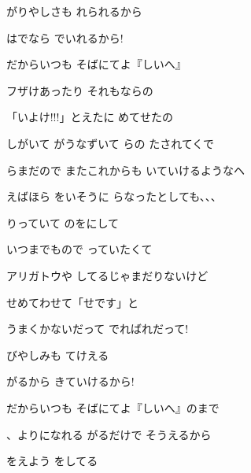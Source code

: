 \documentclass[14pt]{ltjsarticle}
\begin{document}
{  がりやしさも れられるから
  \jisho{}

  はでなら でいれるから!
  \jisho{}

  
だからいつも そばにてよ『しいへ』
  \jisho{}

\item
  フザけあったり それもならの
  \jisho{}

  
「いよけ!!!」とえたに めてせたの
  \jisho{}

  しがいて がうなずいて らの たされてくで
  \jisho{}

  らまだので またこれからも いていけるようなヘ
  \jisho{}

\item
  えばほら をいそうに らなったとしても、、、
  \jisho{}

\item
  りっていて のをにして
  \jisho{}

  
いつまでもので っていたくて
  \jisho{}

  
アリガトウや  してるじゃまだりないけど
  \jisho{}

  
せめてわせて「せです」と
  \jisho{}

\item
  
うまくかないだって でればれだって!
  \jisho{}

  びやしみも てけえる
  \jisho{}

  がるから きていけるから!
  \jisho{}

  
だからいつも そばにてよ『しいへ』のまで
  \jisho{}

\item
  、よりになれる がるだけで そうえるから
  \jisho{}

     をえよう をしてる
  \jisho{}

}
\end{document}
